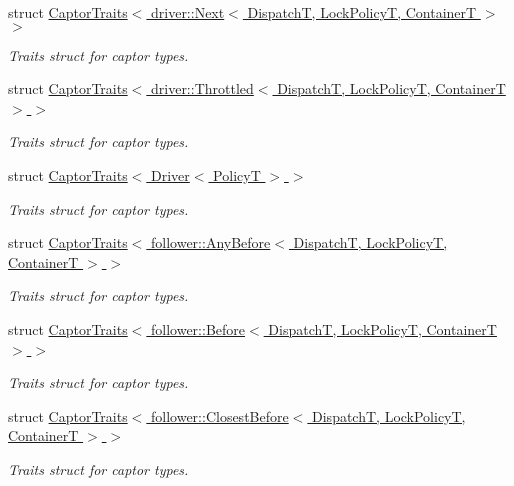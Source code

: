 \begin{DoxyCompactItemize}
struct \hyperlink{structflow_1_1_captor_traits_3_01driver_1_1_next_3_01_dispatch_t_00_01_lock_policy_t_00_01_container_t_01_4_01_4}{Captor\+Traits$<$ driver\+::\+Next$<$ Dispatch\+T, Lock\+Policy\+T, Container\+T $>$ $>$}
\begin{DoxyCompactList}\small\item\em Traits struct for captor types. \end{DoxyCompactList}\item 
struct \hyperlink{structflow_1_1_captor_traits_3_01driver_1_1_throttled_3_01_dispatch_t_00_01_lock_policy_t_00_01_container_t_01_4_01_4}{Captor\+Traits$<$ driver\+::\+Throttled$<$ Dispatch\+T, Lock\+Policy\+T, Container\+T $>$ $>$}
\begin{DoxyCompactList}\small\item\em Traits struct for captor types. \end{DoxyCompactList}\item 
struct \hyperlink{structflow_1_1_captor_traits_3_01_driver_3_01_policy_t_01_4_01_4}{Captor\+Traits$<$ Driver$<$ Policy\+T $>$ $>$}
\begin{DoxyCompactList}\small\item\em Traits struct for captor types. \end{DoxyCompactList}\item 
struct \hyperlink{structflow_1_1_captor_traits_3_01follower_1_1_any_before_3_01_dispatch_t_00_01_lock_policy_t_00_01_container_t_01_4_01_4}{Captor\+Traits$<$ follower\+::\+Any\+Before$<$ Dispatch\+T, Lock\+Policy\+T, Container\+T $>$ $>$}
\begin{DoxyCompactList}\small\item\em Traits struct for captor types. \end{DoxyCompactList}\item 
struct \hyperlink{structflow_1_1_captor_traits_3_01follower_1_1_before_3_01_dispatch_t_00_01_lock_policy_t_00_01_container_t_01_4_01_4}{Captor\+Traits$<$ follower\+::\+Before$<$ Dispatch\+T, Lock\+Policy\+T, Container\+T $>$ $>$}
\begin{DoxyCompactList}\small\item\em Traits struct for captor types. \end{DoxyCompactList}\item 
struct \hyperlink{structflow_1_1_captor_traits_3_01follower_1_1_closest_before_3_01_dispatch_t_00_01_lock_policy_t_00_01_container_t_01_4_01_4}{Captor\+Traits$<$ follower\+::\+Closest\+Before$<$ Dispatch\+T, Lock\+Policy\+T, Container\+T $>$ $>$}
\begin{DoxyCompactList}\small\item\em Traits struct for captor types. \end{DoxyCompactList}\item 

\end{DoxyCompactItemize}
